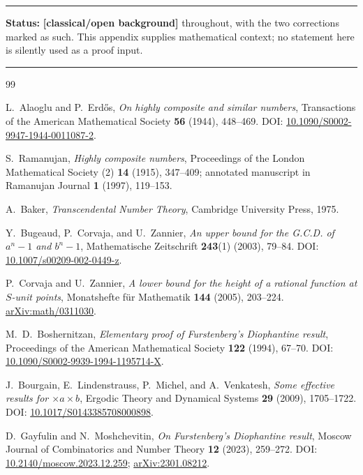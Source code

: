 \documentclass[11pt,oneside]{article}
\theoremstyle{definition}
\theoremstyle{remark}
\newcommand{\statusknown}{\textcolor{classicalgray}{\textbf{[classical/open background]}}}
\newenvironment{statusbox}[1]
{\begin{center}\begin{minipage}{0.94\textwidth}\raggedright\hbadness=10000\hrule
\vspace{0.45em}\textbf{Status:} #1\par\vspace{0.35em}}
{\vspace{0.35em}\hrule\end{minipage}\end{center}}
\begin{document}
\begin{statusbox}{\statusknown{} throughout, with the two corrections marked as such.  This
appendix supplies mathematical context; no statement here is silently used as a proof input.}
\end{statusbox}

\begin{thebibliography}{99}

L.~Alaoglu and P.~Erd\H{o}s,
\newblock \emph{On highly composite and similar numbers},
\newblock Transactions of the American Mathematical Society \textbf{56} (1944), 448--469.
\newblock DOI:
\href{https://doi.org/10.1090/S0002-9947-1944-0011087-2}{10.1090/S0002-9947-1944-0011087-2}.

S.~Ramanujan,
\newblock \emph{Highly composite numbers},
\newblock Proceedings of the London Mathematical Society (2) \textbf{14} (1915), 347--409;
annotated manuscript in Ramanujan Journal \textbf{1} (1997), 119--153.

A.~Baker,
\newblock \emph{Transcendental Number Theory},
\newblock Cambridge University Press, 1975.

Y.~Bugeaud, P.~Corvaja, and U.~Zannier,
\newblock \emph{An upper bound for the G.C.D. of $a^n-1$ and $b^n-1$},
\newblock Mathematische Zeitschrift \textbf{243}(1) (2003), 79--84.
\newblock DOI:
\href{https://doi.org/10.1007/s00209-002-0449-z}{10.1007/s00209-002-0449-z}.

P.~Corvaja and U.~Zannier,
\newblock \emph{A lower bound for the height of a rational function at $S$-unit points},
\newblock Monatshefte f\"ur Mathematik \textbf{144} (2005), 203--224.
\newblock \href{https://arxiv.org/abs/math/0311030}{arXiv:math/0311030}.

M.~D.~Boshernitzan,
\newblock \emph{Elementary proof of Furstenberg's Diophantine result},
\newblock Proceedings of the American Mathematical Society \textbf{122} (1994), 67--70.
\newblock DOI:
\href{https://doi.org/10.1090/S0002-9939-1994-1195714-X}
{10.1090/S0002-9939-1994-1195714-X}.

J.~Bourgain, E.~Lindenstrauss, P.~Michel, and A.~Venkatesh,
\newblock \emph{Some effective results for $\times a\times b$},
\newblock Ergodic Theory and Dynamical Systems \textbf{29} (2009), 1705--1722.
\newblock DOI:
\href{https://doi.org/10.1017/S0143385708000898}
{10.1017/S0143385708000898}.

D.~Gayfulin and N.~Moshchevitin,
\newblock \emph{On Furstenberg's Diophantine result},
\newblock Moscow Journal of Combinatorics and Number Theory \textbf{12} (2023), 259--272.
\newblock DOI:
\href{https://doi.org/10.2140/moscow.2023.12.259}{10.2140/moscow.2023.12.259};
\href{https://arxiv.org/abs/2301.08212}{arXiv:2301.08212}.


\end{thebibliography}
\end{document}
